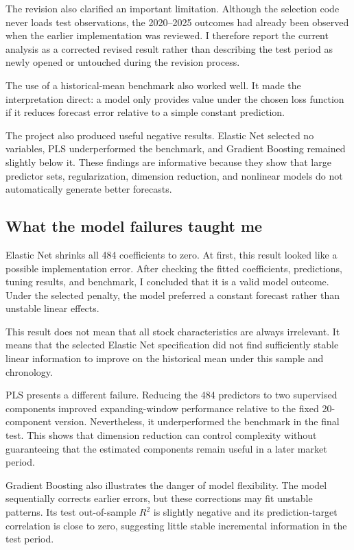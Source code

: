 \documentclass[11pt,a4paper]{article}
\begin{document}
The revision also clarified an important limitation. Although the selection
code never loads test observations, the 2020--2025 outcomes had already been
observed when the earlier implementation was reviewed. I therefore report the
current analysis as a corrected revised result rather than describing the test
period as newly opened or untouched during the revision process.

The use of a historical-mean benchmark also worked well. It made the
interpretation direct: a model only provides value under the chosen loss
function if it reduces forecast error relative to a simple constant prediction.

The project also produced useful negative results. Elastic Net selected no
variables, PLS underperformed the benchmark, and Gradient Boosting remained
slightly below it. These findings are informative because they show that
large predictor sets, regularization, dimension reduction, and nonlinear models
do not automatically generate better forecasts.

\subsection{What the model failures taught me}

Elastic Net shrinks all 484 coefficients to zero. At first, this result looked
like a possible implementation error. After checking the fitted coefficients,
predictions, tuning results, and benchmark, I concluded that it is a valid
model outcome. Under the selected penalty, the model preferred a constant
forecast rather than unstable linear effects.

This result does not mean that all stock characteristics are always irrelevant.
It means that the selected Elastic Net specification did not find sufficiently
stable linear information to improve on the historical mean under this sample
and chronology.

PLS presents a different failure. Reducing the 484 predictors to two supervised
components improved expanding-window performance relative to the fixed
20-component version. Nevertheless, it underperformed the benchmark in the
final test. This shows that dimension reduction can control complexity without
guaranteeing that the estimated components remain useful in a later market
period.

Gradient Boosting also illustrates the danger of model flexibility. The model
sequentially corrects earlier errors, but these corrections may fit unstable
patterns. Its test out-of-sample \(R^2\) is slightly negative and its
prediction-target correlation is close to zero, suggesting little stable
incremental information in the test period.
\end{document}
